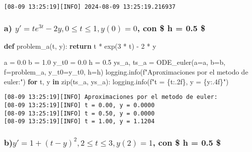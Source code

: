 \documentclass[
  letterpaper,
  DIV=11,
  numbers=noendperiod]{scrartcl}
\newenvironment{Shaded}{\begin{snugshade}}{\end{snugshade}}
\newcommand{\BuiltInTok}[1]{\textcolor[rgb]{0.00,0.23,0.31}{#1}}
\newcommand{\ControlFlowTok}[1]{\textcolor[rgb]{0.00,0.23,0.31}{\textbf{#1}}}
\newcommand{\DecValTok}[1]{\textcolor[rgb]{0.68,0.00,0.00}{#1}}
\newcommand{\FloatTok}[1]{\textcolor[rgb]{0.68,0.00,0.00}{#1}}
\newcommand{\KeywordTok}[1]{\textcolor[rgb]{0.00,0.23,0.31}{\textbf{#1}}}
\newcommand{\NormalTok}[1]{\textcolor[rgb]{0.00,0.23,0.31}{#1}}
\newcommand{\OperatorTok}[1]{\textcolor[rgb]{0.37,0.37,0.37}{#1}}
\newcommand{\SpecialCharTok}[1]{\textcolor[rgb]{0.37,0.37,0.37}{#1}}
\newcommand{\SpecialStringTok}[1]{\textcolor[rgb]{0.13,0.47,0.30}{#1}}
\begin{document}
\begin{verbatim}
[08-09 13:25:19][INFO] 2024-08-09 13:25:19.216937
\end{verbatim}

\subsubsection{\texorpdfstring{a)
\(y' = t e^{3t} - 2y , 0 \leq t \leq 1 ,  y(0) = 0\), con \$ h = 0.5
\$}{a) y\textquotesingle{} = t e\^{}\{3t\} - 2y , 0 \textbackslash leq t \textbackslash leq 1 ,  y(0) = 0, con \$ h = 0.5 \$}}\label{a-y-t-e3t---2y-0-leq-t-leq-1-y0-0-con-h-0.5}

\begin{Shaded}
\begin{Highlighting}[]
\KeywordTok{def}\NormalTok{ problem\_a(t, y):}
    \ControlFlowTok{return}\NormalTok{ t }\OperatorTok{*}\NormalTok{ exp(}\DecValTok{3} \OperatorTok{*}\NormalTok{ t) }\OperatorTok{{-}} \DecValTok{2} \OperatorTok{*}\NormalTok{ y}

\NormalTok{a }\OperatorTok{=} \FloatTok{0.0}  
\NormalTok{b }\OperatorTok{=} \FloatTok{1.0}  
\NormalTok{y\_t0 }\OperatorTok{=} \FloatTok{0.0}  
\NormalTok{h }\OperatorTok{=} \FloatTok{0.5}  
\NormalTok{ys\_a, ts\_a }\OperatorTok{=}\NormalTok{ ODE\_euler(a}\OperatorTok{=}\NormalTok{a, b}\OperatorTok{=}\NormalTok{b, f}\OperatorTok{=}\NormalTok{problem\_a, y\_t0}\OperatorTok{=}\NormalTok{y\_t0, h}\OperatorTok{=}\NormalTok{h)}
\NormalTok{logging.info(}\SpecialStringTok{f"Aproximaciones por el metodo de euler:"}\NormalTok{)}
\ControlFlowTok{for}\NormalTok{ t, y }\KeywordTok{in} \BuiltInTok{zip}\NormalTok{(ts\_a, ys\_a):}
\NormalTok{    logging.info(}\SpecialStringTok{f"t = }\SpecialCharTok{\{}\NormalTok{t}\SpecialCharTok{:.2f\}}\SpecialStringTok{, y = }\SpecialCharTok{\{}\NormalTok{y}\SpecialCharTok{:.4f\}}\SpecialStringTok{"}\NormalTok{)}
\end{Highlighting}
\end{Shaded}

\begin{verbatim}
[08-09 13:25:19][INFO] Aproximaciones por el metodo de euler:
[08-09 13:25:19][INFO] t = 0.00, y = 0.0000
[08-09 13:25:19][INFO] t = 0.50, y = 0.0000
[08-09 13:25:19][INFO] t = 1.00, y = 1.1204
\end{verbatim}

\subsubsection{\texorpdfstring{b)\(y' = 1+{(t-y)}^2, 2 \leq t \leq 3 ,  y(2) = 1\),
con \$ h = 0.5
\$}{b)y\textquotesingle{} = 1+\{(t-y)\}\^{}2, 2 \textbackslash leq t \textbackslash leq 3 ,  y(2) = 1, con \$ h = 0.5 \$}}\label{by-1t-y2-2-leq-t-leq-3-y2-1-con-h-0.5}
\end{document}
